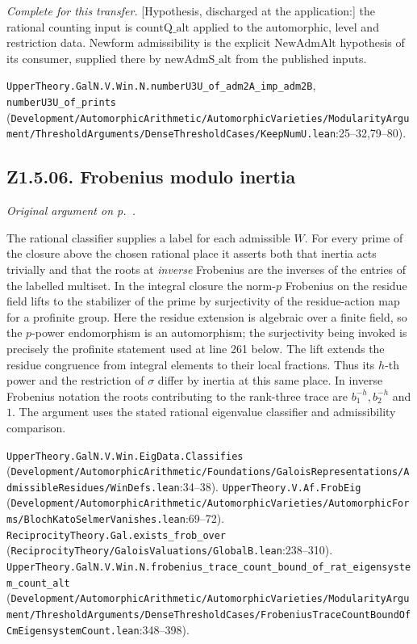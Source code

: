 \emph{Complete for this transfer.} [Hypothesis, discharged at the application:] the rational counting input is $\mathrm{countQ\_alt}$ applied to the automorphic, level and restriction data. Newform admissibility is the explicit $\mathrm{NewAdmAlt}$ hypothesis of its consumer, supplied there by $\mathrm{newAdmS\_alt}$ from the published inputs.

{\footnotesize \nolinkurl{UpperTheory.GalN.V.Win.N.numberU3U_of_adm2A_imp_adm2B}, \nolinkurl{numberU3U_of_prints} (\nolinkurl{Development/AutomorphicArithmetic/AutomorphicVarieties/ModularityArgument/ThresholdArguments/DenseThresholdCases/KeepNumU.lean}\allowbreak:25--32,79--80).}

\subsection{Z1.5.06. Frobenius modulo inertia}\label{r6:review:Z1.5.06} \emph{Original argument on p.~\pageref{r5:Z1.5.06}.} 

The rational classifier supplies a label for each admissible $W$. For every prime of the closure above the chosen rational place it asserts both that inertia acts trivially and that the roots at \emph{inverse} Frobenius are the inverses of the entries of the labelled multiset. In the integral closure the norm-$p$ Frobenius on the residue field lifts to the stabilizer of the prime by surjectivity of the residue-action map for a profinite group. Here the residue extension is algebraic over a finite field, so the $p$-power endomorphism is an automorphism; the surjectivity being invoked is precisely the profinite statement used at line 261 below. The lift extends the residue congruence from integral elements to their local fractions. Thus its $h$-th power and the restriction of $\sigma$ differ by inertia at this same place. In inverse Frobenius notation the roots contributing to the rank-three trace are $b_1^{-h},b_2^{-h}$ and $1$. The argument uses the stated rational eigenvalue classifier and admissibility comparison.
\par{\footnotesize \nolinkurl{UpperTheory.GalN.V.Win.EigData.Classifies} (\nolinkurl{Development/AutomorphicArithmetic/Foundations/GaloisRepresentations/AdmissibleResidues/WinDefs.lean}\allowbreak:34--38). \nolinkurl{UpperTheory.V.Af.FrobEig} (\nolinkurl{Development/AutomorphicArithmetic/AutomorphicVarieties/AutomorphicForms/BlochKatoSelmerVanishes.lean}\allowbreak:69--72). \nolinkurl{ReciprocityTheory.Gal.exists_frob_over} (\nolinkurl{ReciprocityTheory/GaloisValuations/GlobalB.lean}\allowbreak:238--310). \nolinkurl{UpperTheory.GalN.V.Win.N.frobenius_trace_count_bound_of_rat_eigensystem_count_alt} (\nolinkurl{Development/AutomorphicArithmetic/AutomorphicVarieties/ModularityArgument/ThresholdArguments/DenseThresholdCases/FrobeniusTraceCountBoundOfCmEigensystemCount.lean}\allowbreak:348--398).\par}

